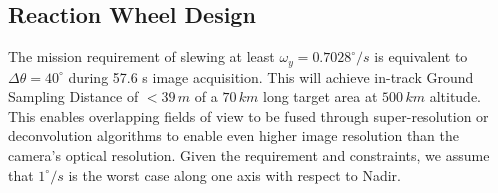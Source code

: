 \subsection{Reaction Wheel Design} \label{sec:reactionwheeldesign}
The mission requirement of slewing at least $\omega_{y}=0.7028^{\circ}/s$ is equivalent to $\Delta \theta= 40^{\circ}$ during 57.6 s image acquisition. This will achieve in-track Ground Sampling Distance of $<39 \hspace{2pt} m$ of a $70 \hspace{2pt} km$ long target area at $500 \hspace{2pt} km$ altitude. This enables overlapping fields of view to be fused through super-resolution or deconvolution algorithms to enable even higher image resolution than the camera's optical resolution. Given the requirement and constraints, we assume that $1^{\circ}/s$ is the worst case along one axis with respect to Nadir. 

